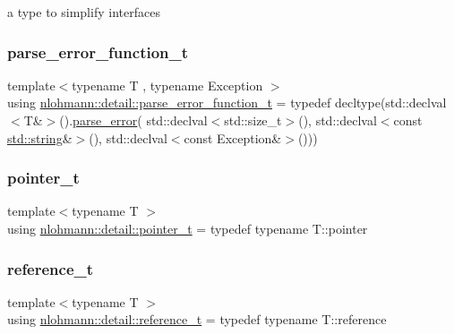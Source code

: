 a type to simplify interfaces 

\mbox{\label{namespacenlohmann_1_1detail_a264d4d58bc1fd82bcc7bf6bf73d6acad}} 
\subsubsection{\texorpdfstring{parse\+\_\+error\+\_\+function\+\_\+t}{parse\_error\_function\_t}}
{\footnotesize\ttfamily template$<$typename T , typename Exception $>$ \\
using \hyperlink{namespacenlohmann_1_1detail_a264d4d58bc1fd82bcc7bf6bf73d6acad}{nlohmann\+::detail\+::parse\+\_\+error\+\_\+function\+\_\+t} = typedef decltype(std\+::declval$<$T\&$>$().\hyperlink{classnlohmann_1_1detail_1_1parse__error}{parse\+\_\+error}( std\+::declval$<$std\+::size\+\_\+t$>$(), std\+::declval$<$const \hyperlink{namespacenlohmann_1_1detail_a1ed8fc6239da25abcaf681d30ace4985ab45cffe084dd3d20d928bee85e7b0f21}{std\+::string}\&$>$(), std\+::declval$<$const Exception\&$>$()))}

\mbox{\label{namespacenlohmann_1_1detail_a26dc71e2dd9336587e56062178f9abce}} 
\subsubsection{\texorpdfstring{pointer\+\_\+t}{pointer\_t}}
{\footnotesize\ttfamily template$<$typename T $>$ \\
using \hyperlink{namespacenlohmann_1_1detail_a26dc71e2dd9336587e56062178f9abce}{nlohmann\+::detail\+::pointer\+\_\+t} = typedef typename T\+::pointer}

\mbox{\label{namespacenlohmann_1_1detail_a082bdafd3b4c61d9d1e92b35b8f75ee3}} 
\subsubsection{\texorpdfstring{reference\+\_\+t}{reference\_t}}
{\footnotesize\ttfamily template$<$typename T $>$ \\
using \hyperlink{namespacenlohmann_1_1detail_a082bdafd3b4c61d9d1e92b35b8f75ee3}{nlohmann\+::detail\+::reference\+\_\+t} = typedef typename T\+::reference}

